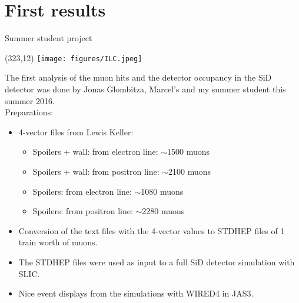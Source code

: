 \documentclass[xcolor={dvipsnames}]{beamer}
\newcommand{\ilclogo}{
  \setlength{\TPHorizModule}{1pt}
  \setlength{\TPVertModule}{1pt}
  \begin{textblock}{1}(323,12)
   \texttt{[image: figures/ILC.jpeg]}
  \end{textblock}
}
\begin{document}
\section{First results}
\begin{frame}{Summer student project}
\ilclogo
The first analysis of the muon hits and the detector occupancy in the SiD detector was done by Jonas Glombitza, Marcel's and my summer student this summer 2016.\\
\vspace*{0.5cm}
Preparations:
\begin{itemize}
\item 4-vector files from Lewis Keller:
\begin{itemize}
 \item Spoilers + wall: from electron line: $\sim$1500 muons
 \item Spoilers + wall: from positron line: $\sim$2100 muons
 \item Spoilers: from electron line: $\sim$1080 muons
 \item Spoilers: from positron line: $\sim$2280 muons
\end{itemize}
\item Conversion of the text files with the 4-vector values to  STDHEP files of 1 train worth of muons.
\item The STDHEP files were used as input to a full SiD detector simulation with SLIC.
\item Nice event displays from the simulations with WIRED4 in JAS3.
\end{itemize}

\end{frame}
\end{document}
